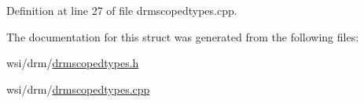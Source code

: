 Definition at line 27 of file drmscopedtypes.\+cpp.


\begin{DoxyCode}{0}
\end{DoxyCode}


The documentation for this struct was generated from the following files\+:\begin{DoxyCompactItemize}
\item 
wsi/drm/\mbox{\hyperlink{drmscopedtypes_8h}{drmscopedtypes.\+h}}\item 
wsi/drm/\mbox{\hyperlink{drmscopedtypes_8cpp}{drmscopedtypes.\+cpp}}\end{DoxyCompactItemize}
